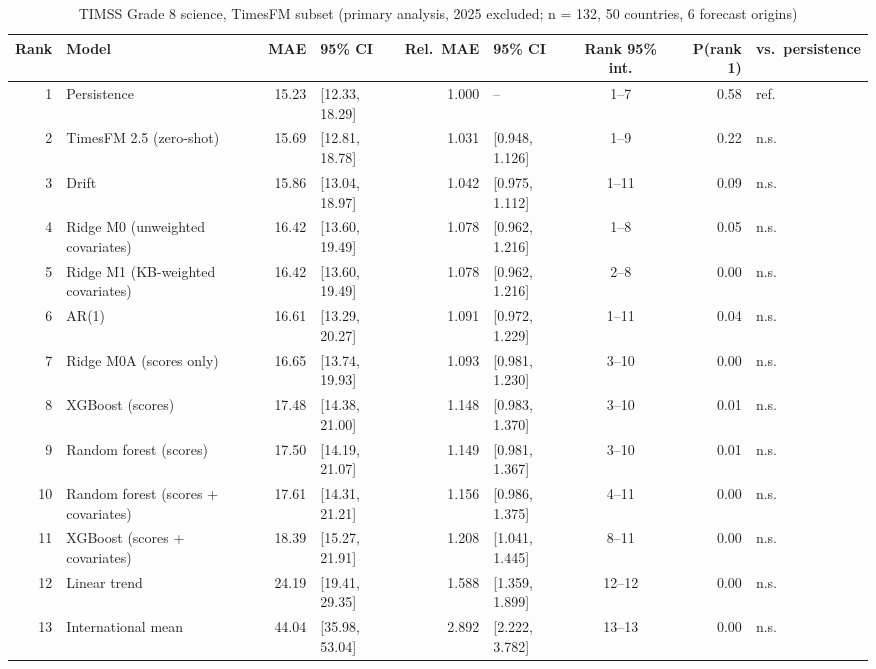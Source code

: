 \begin{table}[htbp]
\centering
\footnotesize
\caption{TIMSS Grade 8 science, TimesFM subset (primary analysis, 2025 excluded; n = 132, 50 countries, 6 forecast origins)}
\label{tab:A14}
\begin{tabular}{rlrlrlcrl}
\toprule
Rank & Model & MAE & 95\% CI & Rel.\ MAE & 95\% CI & Rank 95\% int. & P(rank 1) & vs.\ persistence \\
\midrule
1 & Persistence & 15.23 & [12.33, 18.29] & 1.000 & -- & 1--7 & 0.58 & ref. \\
2 & TimesFM 2.5 (zero-shot) & 15.69 & [12.81, 18.78] & 1.031 & [0.948, 1.126] & 1--9 & 0.22 & n.s. \\
3 & Drift & 15.86 & [13.04, 18.97] & 1.042 & [0.975, 1.112] & 1--11 & 0.09 & n.s. \\
4 & Ridge M0 (unweighted covariates) & 16.42 & [13.60, 19.49] & 1.078 & [0.962, 1.216] & 1--8 & 0.05 & n.s. \\
5 & Ridge M1 (KB-weighted covariates) & 16.42 & [13.60, 19.49] & 1.078 & [0.962, 1.216] & 2--8 & 0.00 & n.s. \\
6 & AR(1) & 16.61 & [13.29, 20.27] & 1.091 & [0.972, 1.229] & 1--11 & 0.04 & n.s. \\
7 & Ridge M0A (scores only) & 16.65 & [13.74, 19.93] & 1.093 & [0.981, 1.230] & 3--10 & 0.00 & n.s. \\
8 & XGBoost (scores) & 17.48 & [14.38, 21.00] & 1.148 & [0.983, 1.370] & 3--10 & 0.01 & n.s. \\
9 & Random forest (scores) & 17.50 & [14.19, 21.07] & 1.149 & [0.981, 1.367] & 3--10 & 0.01 & n.s. \\
10 & Random forest (scores + covariates) & 17.61 & [14.31, 21.21] & 1.156 & [0.986, 1.375] & 4--11 & 0.00 & n.s. \\
11 & XGBoost (scores + covariates) & 18.39 & [15.27, 21.91] & 1.208 & [1.041, 1.445] & 8--11 & 0.00 & n.s. \\
12 & Linear trend & 24.19 & [19.41, 29.35] & 1.588 & [1.359, 1.899] & 12--12 & 0.00 & n.s. \\
13 & International mean & 44.04 & [35.98, 53.04] & 2.892 & [2.222, 3.782] & 13--13 & 0.00 & n.s. \\
\bottomrule
\end{tabular}
\par{}
\end{table}
